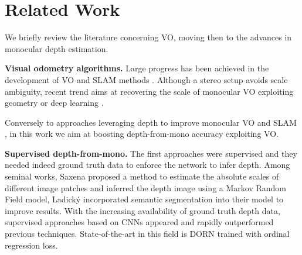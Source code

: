 \documentclass[10pt,twocolumn,letterpaper]{article}
\begin{document}
\section{Related Work}

We briefly review the literature concerning VO, moving then to
the advances in monocular depth estimation.

\textbf{Visual odometry algorithms.} Large progress has been achieved in the development of VO and SLAM methods \cite{dso,engel14eccv,orbslam2,newcombe2011dtam}.
Although a stereo setup \cite{dso,engel2015large,orbslam2} avoids scale ambiguity, recent trend aims at recovering the scale of monocular VO exploiting geometry \cite{Wang_2018_ICRA,fanani_2017} or deep learning \cite{tateno2017cnn,yin2017scale,yang2018deep}.

Conversely to approaches leveraging depth to improve monocular VO and SLAM \cite{tateno2017cnn,yang2018deep}, in this work we aim at boosting depth-from-mono accuracy exploiting VO.

\textbf{Supervised depth-from-mono.}
The first approaches were supervised and they needed indeed ground truth data to enforce the network to infer depth. Among seminal works, Saxena \etal \cite{Saxena} proposed a method to estimate the absolute scales of different image patches and inferred the depth image using a Markov Random Field model,  
Ladický \etal \cite{Ladicky} incorporated semantic segmentation into their model to improve results.
With the increasing availability of ground truth depth data, supervised approaches based on CNNs \cite{Eigen,liu2016learning} appeared and rapidly outperformed \cite{laina2016deeper,liu2016learning, xu2018supervised} previous techniques. 
State-of-the-art in this field is DORN \cite{fu2018supervised} trained with ordinal regression loss.
\end{document}
